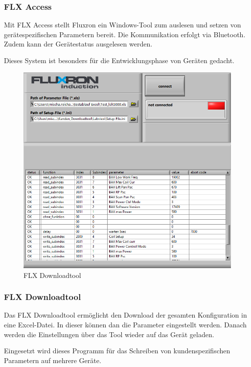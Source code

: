 \subsubsection{FLX Access}
\label{subsubsec:FLX Access}

Mit FLX Access stellt Fluxron ein Windows-Tool zum auslesen und setzen von gerätespezifischen Parametern bereit. Die Kommunikation erfolgt via Bluetooth. Zudem kann der Gerätestatus ausgelesen werden. 

Dieses System ist besonders für die Entwicklungsphase von Geräten gedacht.

\vspace{2cm}
\WFclear
\begin{figure}
	\includegraphics[scale=0.25]{analysis/res/flxdltool}
	\caption{FLX Downloadtool}
\end{figure}

\subsubsection{FLX Downloadtool}
\label{subsubsec:FLX Downloadtool}

Das FLX Downloadtool ermöglicht den Download der gesamten Konfiguration in eine Excel-Datei. In dieser können dan die Parameter eingestellt werden. Danach werden die Einstellungen über das Tool wieder auf das Gerät geladen.

Eingesetzt wird dieses Programm für das Schreiben von kundenspezifischen Parametern auf mehrere Geräte.
\WFclear